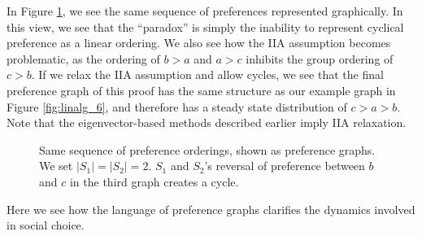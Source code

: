 In Figure \ref{fig:impossiblity_graphs}, we see the same sequence of preferences represented graphically.
In this view, we see that the ``paradox'' is simply the inability to represent cyclical preference as a linear ordering.
We also see how the IIA assumption becomes problematic, as the ordering of $b > a$ and $a > c$ inhibits the group ordering of $c > b$.
If we relax the IIA assumption and allow cycles, we see that the final preference graph of this proof has the same structure as our example graph in Figure \ref{fig:linalg_6}, and therefore has a steady state distribution of $c > a > b$.
Note that the eigenvector-based methods described earlier imply IIA relaxation.

\begin{figure}[!htb]
\centering
{}\quad
{} \quad
{}
\caption{Same sequence of preference orderings, shown as preference graphs. We set $|S_1| = |S_2| = 2$. $S_1$ and $S_2$'s reversal of preference between $b$ and $c$ in the third graph creates a cycle.}
\label{fig:impossiblity_graphs} 
\end{figure}

Here we see how the language of preference graphs clarifies the dynamics involved in social choice.
